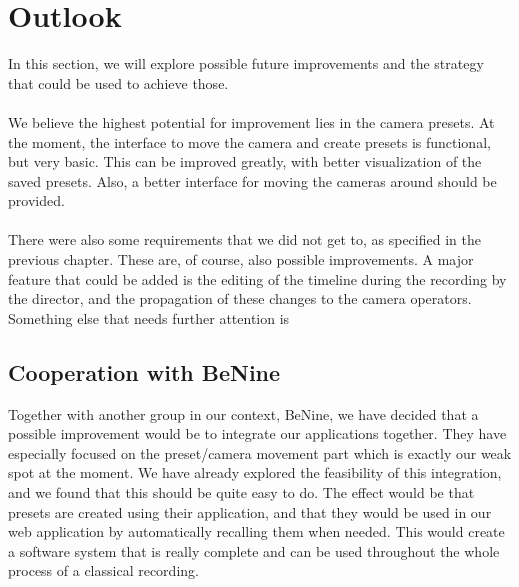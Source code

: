 \section{Outlook}

In this section, we will explore possible future improvements and the strategy that could be used to achieve those.\\\\
We believe the highest potential for improvement lies in the camera presets. At the moment, the interface to move the camera and create presets is functional, but very basic. This can be improved greatly, with better visualization of the saved presets. Also, a better interface for moving the cameras around should be provided.\\\\
There were also some requirements that we did not get to, as specified in the previous chapter. These are, of course, also possible improvements. A major feature that could be added is the editing of the timeline during the recording by the director, and the propagation of these changes to the camera operators.\\
Something else that needs further attention is 

\subsection{Cooperation with BeNine}
Together with another group in our context, BeNine, we have decided that a possible improvement would be to integrate our applications together. They have especially focused on the preset/camera movement part which is exactly our weak spot at the moment. We have already explored the feasibility of this integration, and we found that this should be quite easy to do. The effect would be that presets are created using their application, and that they would be used in our web application by automatically recalling them when needed. This would create a software system that is really complete and can be used throughout the whole process of a classical recording.


